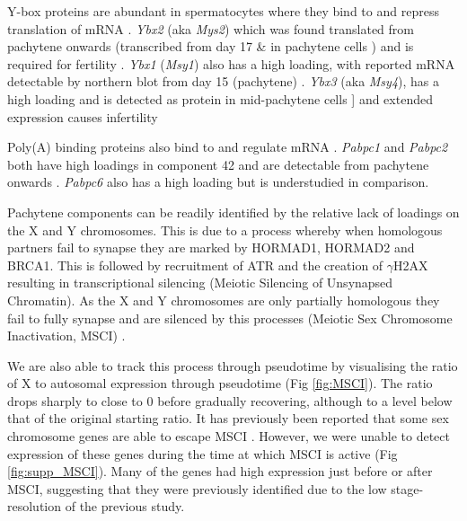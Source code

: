 Y-box proteins are abundant in spermatocytes where they bind to and repress translation of mRNA \parencite[Reviwed in]{Kleene2016Positiondependent}. \textit{Ybx2} (aka \textit{Mys2}) which was found translated from pachytene onwards \parencite{Kwon1993Proteins, Oko1996Germ} (transcribed from day 17 \& in pachytene cells \parencite{Gu1998Mammalian}) and is required for fertility \parencite{Yang2005Absence}. \textit{Ybx1} (\textit{Msy1}) also has a high loading, with reported mRNA detectable by northern blot from day 15 (pachytene) \parencite{Tafuri1993mouse}. \textit{Ybx3} (aka \textit{Msy4}), has a high loading and is detected as protein in mid-pachytene cells \parencite{Davies2000SequenceSpecific}] and extended expression causes infertility \parencite{Giorgini2002Translational}

Poly(A) binding proteins also bind to and regulate mRNA \parencite[reviewed in]{OZTURK2018Potential}. \textit{Pabpc1} and \textit{Pabpc2} both have high loadings in component 42 and are detectable from pachytene onwards \parencite{C.Kleene1994Developmental, Gu1995Poly, Kleene1998Mouse, Lee2000Expression, Kimura2009Characterization}. \textit{Pabpc6} also has a high loading but is understudied in comparison.

Pachytene components can be readily identified by the relative lack of loadings on the X and Y chromosomes. This is due to a process whereby when homologous partners fail to synapse they are marked by HORMAD1, HORMAD2 and BRCA1. This is followed by recruitment of ATR and the creation of $\gamma$H2AX resulting in transcriptional silencing (Meiotic Silencing of Unsynapsed Chromatin). As the X and Y chromosomes are only partially homologous they fail to fully synapse and are silenced by this processes (Meiotic Sex Chromosome Inactivation, MSCI) \parencite{Turner2007Meiotic, Turner2015Meiotic}.

We are also able to track this process through pseudotime by visualising the ratio of X to autosomal expression through pseudotime (Fig \ref{fig:MSCI}). The ratio drops sharply to close to 0 before gradually recovering, although to a level below that of the original starting ratio. It has previously been reported that some sex chromosome genes are able to escape MSCI \parencite{daCruz2016Transcriptome, Soumillon2013Cellular}. However, we were unable to detect expression of these genes during the time at which MSCI is active (Fig \ref{fig:supp_MSCI}). Many of the genes had high expression just before or after MSCI, suggesting that they were previously identified due to the low stage-resolution of the previous study. 

